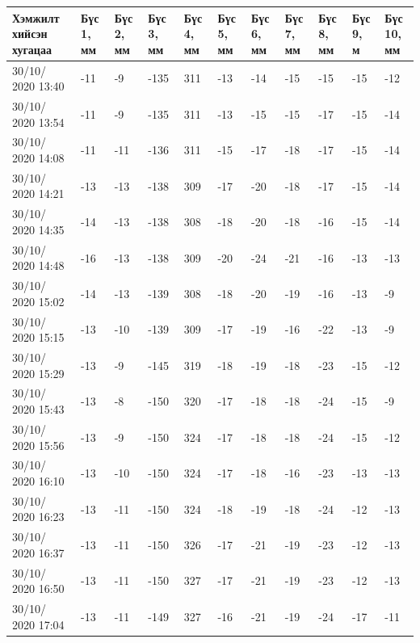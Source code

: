 \begin{table}[h]
    \centering
    \begin{tabular}{|p{1.5cm}|p{0.8cm}|p{0.8cm}|p{0.8cm}|p{0.8cm}|p{0.8cm}|p{0.8cm}|p{0.8cm}|p{0.8cm}|p{0.8cm}|p{0.8cm}|}
         \hline
     Хэмжилт хийсэн хугацаа & Бүс 1, мм&	Бүс 2, мм&	Бүс 3, мм&	Бүс 4, мм&	Бүс 5, мм&	Бүс 6, мм&	Бүс 7, мм&	Бүс 8, мм&	Бүс 9, м&	Бүс 10, мм\\ \hline
30/10/ 2020 13:40&	-11&	-9&	-135&	311&-13&	-14&-15&-15&-15&	-12\\ \hline
30/10/ 2020 13:54&	-11&	-9&	-135&	311&-13&	-15&-15&-17&-15&	-14\\ \hline
30/10/ 2020 14:08&	-11&	-11&-136&	311&-15&	-17&-18&-17&-15&	-14\\ \hline
30/10/ 2020 14:21&	-13&	-13&-138&	309&-17&	-20&-18&-17&-15&	-14\\ \hline
30/10/ 2020 14:35&	-14&	-13&-138&	308&-18&	-20&-18&-16&-15&	-14\\ \hline
30/10/ 2020 14:48&	-16&	-13&-138&	309&-20&	-24&-21&-16&-13&	-13\\ \hline
30/10/ 2020 15:02&	-14&	-13&-139&	308&-18&	-20&-19&-16&-13&	-9\\ \hline
30/10/ 2020 15:15&	-13&	-10&-139&	309&-17&	-19&-16&-22&-13&	-9\\ \hline
30/10/ 2020 15:29&	-13&	-9&	-145&	319&-18&	-19&-18&-23&-15&	-12\\ \hline
30/10/ 2020 15:43&	-13&	-8&	-150&	320&-17&	-18&-18&-24&-15&	-9\\ \hline
30/10/ 2020 15:56&	-13&	-9&	-150&	324&-17&	-18&-18&-24&-15&	-12\\ \hline
30/10/ 2020 16:10&	-13&	-10&-150&	324&-17&	-18&-16&-23&-13&	-13\\ \hline
30/10/ 2020 16:23&	-13&	-11&-150&	324&-18&	-19&-18&-24&-12&	-13\\ \hline
30/10/ 2020 16:37&	-13&	-11&-150&	326&-17&	-21&-19&-23&-12&	-13\\ \hline
30/10/ 2020 16:50&	-13&	-11&-150&	327&-17&	-21&-19&-23&-12&	-13\\ \hline
30/10/ 2020 17:04&	-13&	-11&-149&	327&-16&	-21&-19&-24&-17&	-11\\ \hline
    \end{tabular}
\end{table}
